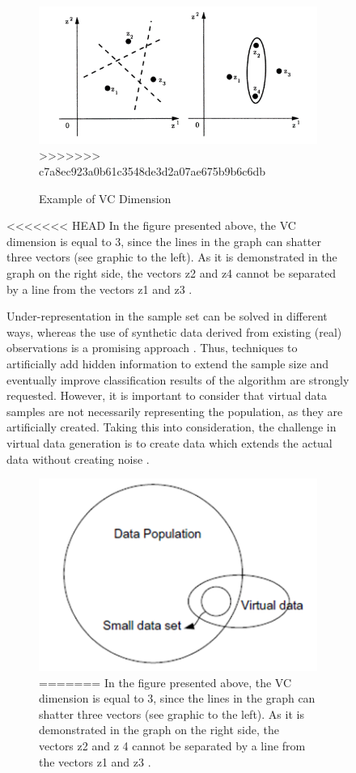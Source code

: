 \documentclass[parskip=full]{scrartcl}
\begin{document}
\begin{figure}[h]
\begin{figure}[h]
	\centering
	\includegraphics[width=0.6\linewidth]{"./resources/VC Dimension"}
>>>>>>> c7a8ec923a0b61c3548de3d2a07ae675b9b6c6db
	\caption{Example of VC Dimension \cite{Vapnik.2008}}
	\label{fig:vc-dimension}
\end{figure}

<<<<<<< HEAD
In the figure presented above, the VC dimension is equal to 3, since the lines in the graph can shatter three vectors (see graphic to the left). As it is demonstrated in the graph on the right side, the vectors z{\tiny 2} and z{\tiny 4} cannot be separated by a line from the vectors z{\tiny 1} and z{\tiny 3} \cite{Vapnik.2008}.

Under-representation in the sample set can be solved in different ways, whereas the use of synthetic data derived from existing (real) observations is a promising approach \cite{Sezer.2014}. Thus, techniques to artificially add hidden information to extend the sample size and eventually improve classification results of the algorithm are strongly requested. However, it is important to consider that virtual data samples are not necessarily representing the population, as they are artificially created. Taking this into consideration, the challenge in virtual data generation is to create data which extends the actual data without creating noise \cite{Li.2006}. 

\begin{figure}[h]
	\centering
	\includegraphics[width=0.35\linewidth]{Relationship}
=======
In the figure presented above, the VC dimension is equal to 3, since the lines
in the graph can shatter three vectors (see graphic to the left). As it is
demonstrated in the graph on the right side, the vectors z{\tiny 2} and z{\tiny
4} cannot be separated by a line from the vectors z{\tiny 1} and z{\tiny 3}
\cite{Vapnik.2008}.


\end{figure}
\end{figure}
\end{document}
